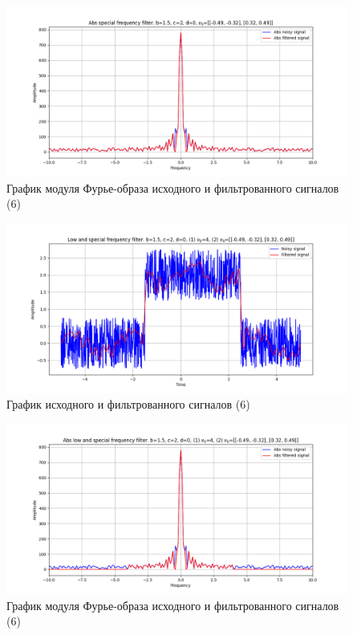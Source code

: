 \documentclass[a4paper, 12pt]{article}
\begin{document}
    \begin{figure}[!htb]
        \centering
        \includegraphics[scale=0.48]{6_abs_u_U_nospec.png}
        \captionsetup{skip=0pt}
        \caption{График модуля Фурье-образа исходного и фильтрованного сигналов (6)}
        \label{fig:dchjdhc}
    \end{figure}
    \begin{figure}[!htb]
        \centering
        \includegraphics[scale=0.48]{6_3_u_flt_u_nospec.png}
        \captionsetup{skip=0pt}
        \caption{График исходного и фильтрованного сигналов (6)}
        \label{fig:sdjfsdfj}
    \end{figure}
    \begin{figure}[!htb]
        \centering
        \includegraphics[scale=0.48]{6_3_abs_u_U_nospec.png}
        \captionsetup{skip=0pt}
        \caption{График модуля Фурье-образа исходного и фильтрованного сигналов (6)}
        \label{fig:oirjghofgj}
    \end{figure}
\end{document}
